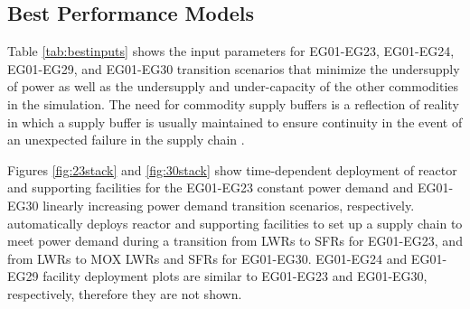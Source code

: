 \subsection{Best Performance Models}
Table \ref{tab:bestinputs} shows the \deploy input parameters for
EG01-EG23, EG01-EG24, EG01-EG29, and EG01-EG30 transition scenarios
that minimize the undersupply of power as well as the
undersupply and under-capacity of the other commodities
in the simulation. 
The need for commodity supply buffers is a reflection of reality
in which a supply buffer is usually maintained to ensure 
continuity in the event of an unexpected failure in the supply chain
\cite{united_nations_institute_for_disarmament_research_multilateralization_2013}.

Figures \ref{fig:23stack} and \ref{fig:30stack} show
time-dependent deployment of reactor and supporting facilities for 
the EG01-EG23 constant power demand and EG01-EG30 linearly increasing power demand 
transition scenarios, respectively. 
\deploy automatically deploys reactor and supporting facilities 
to set up a supply chain to meet power demand
during a transition from \glspl{LWR} to \glspl{SFR} for EG01-EG23, 
and from \glspl{LWR} to \gls{MOX} \glspl{LWR} and \glspl{SFR} for 
EG01-EG30. 
EG01-EG24 and EG01-EG29 facility deployment plots are similar to 
EG01-EG23 and EG01-EG30, respectively, therefore they are not shown. 

